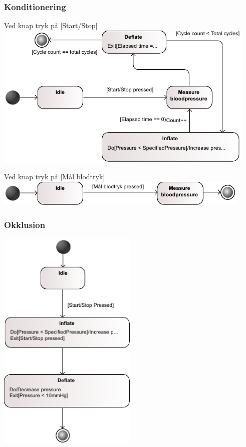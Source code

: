 \subsubsection{Konditionering}
Ved knap tryk på [Start/Stop] \\
\includegraphics[width=\textwidth]{pdfs/STM_Konditionering1-crop.pdf}

Ved knap tryk på [Mål blodtryk] \\
\includegraphics[width=\textwidth]{pdfs/STM_Konditionering2-crop.pdf}

\subsubsection{Okklusion}
\begin{center}
\includegraphics[width=0.5\textwidth]{pdfs/STM_Okklusion-crop.pdf}
\end{center}

